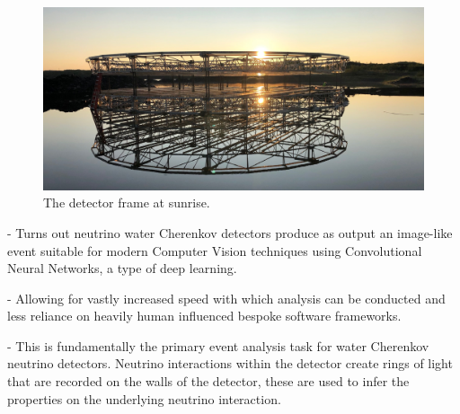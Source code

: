 \begin{figure} %
    \includegraphics[width=\textwidth]{diagrams/4-chips/sunrise.pdf}
    \caption*{The \chipsfive detector frame at sunrise.}
\end{figure}

- Turns out neutrino water Cherenkov detectors produce as output an image-like event suitable for
modern Computer Vision techniques using Convolutional Neural Networks, a type of deep learning.

- Allowing for vastly increased speed with which analysis can be conducted and less reliance on
heavily human influenced bespoke software frameworks.

- This is fundamentally the primary event analysis task for water Cherenkov neutrino detectors.
Neutrino interactions within the detector create rings of light that are recorded on the walls of
the detector, these are used to infer the properties on the underlying neutrino interaction.